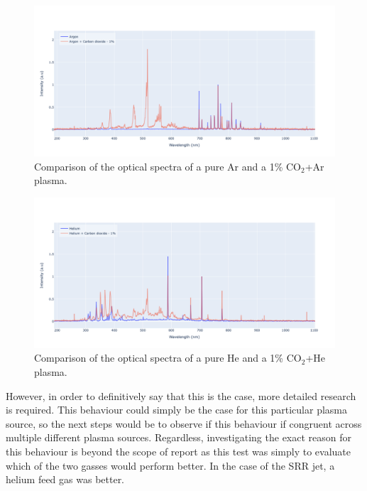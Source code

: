 \begin{figure}[h!]
	\centering
    \includegraphics[width=\linewidth]{chapter_6/figures/ar_vs_ar_co2_optical_spectra.png} 
	\caption{Comparison of the optical spectra of a pure Ar and a 1\% CO$_2$+Ar plasma.}
	\label{fig:ar_vs_ar_co2_optical_spectra}
\end{figure} 

\begin{figure}[h!]
	\centering
    \includegraphics[width=\linewidth]{chapter_6/figures/he_vs_he_co2_optical_spectra.png} 
	\caption{Comparison of the optical spectra of a pure He and a 1\% CO$_2$+He plasma.}
	\label{fig:he_vs_he_co2_optical_spectra}
\end{figure} 

However, in order to definitively say that this is the case, more detailed research is required. This behaviour could simply be the case for this particular plasma source, so the next steps would be to observe if this behaviour if congruent across multiple different plasma sources. Regardless, investigating the exact reason for this behaviour is beyond the scope of report as this test was simply to evaluate which of the two gasses would perform better. In the case of the SRR jet, a helium feed gas was better.

